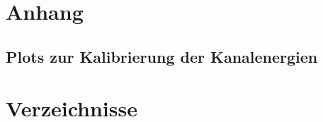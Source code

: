 \documentclass[draft, slug=CS, room=Andreas-Schubert-Bau\,\ Labor\ 406,
supervisor=Juliane\ Volkmer, coursedate=29.\ 11.\ 2019]{../../Lab_Report_LaTeX/lab_report}
\begin{document}
\section{Anhang}
\label{sec:anshang}

\subsection{Plots zur Kalibrierung der Kanalenergien}
\label{sec:ancalplot}


\begin{figure}[H]\centering
  
  \caption{}
  \label{fig:}
\end{figure}

\begin{figure}[H]\centering
  
  \caption{}
  \label{fig:}
\end{figure}

\begin{figure}[H]\centering
  
  \caption{}
  \label{fig:}
\end{figure}

\begin{figure}[H]\centering
  
  \caption{}
  \label{fig:}
\end{figure}

\begin{figure}[H]\centering
  
  \caption{}
  \label{fig:}
\end{figure}

\begin{figure}[H]\centering
  
  \caption{}
  \label{fig:}
\end{figure}

\begin{figure}[H]\centering
  
  \caption{}
  \label{fig:}
\end{figure}

\section{Verzeichnisse}

\label{sec:literatur}

\listoffigures

\listoftables

\printbibliography
\end{document}
